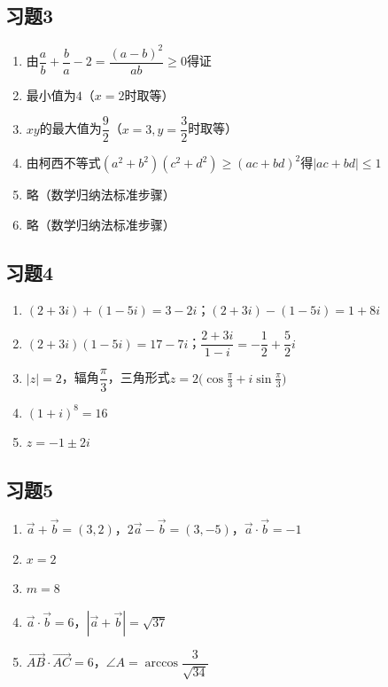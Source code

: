 \documentclass[a4paper,12pt]{ctexart}
\begin{document}
\subsection*{习题3}
\begin{enumerate}
  \item 由$\dfrac{a}{b}+\dfrac{b}{a}-2=\dfrac{(a-b)^2}{ab}\ge0$得证
  \item 最小值为$4$（$x=2$时取等）
  \item $xy$的最大值为$\dfrac92$（$x=3,y=\dfrac32$时取等）
  \item 由柯西不等式$(a^2+b^2)(c^2+d^2)\ge(ac+bd)^2$得$|ac+bd|\le1$
  \item 略（数学归纳法标准步骤）
  \item 略（数学归纳法标准步骤）
\end{enumerate}

\subsection*{习题4}
\begin{enumerate}
  \item $(2+3i)+(1-5i)=3-2i$；$(2+3i)-(1-5i)=1+8i$
  \item $(2+3i)(1-5i)=17-7i$；$\dfrac{2+3i}{1-i}=-\dfrac12+\dfrac52i$
  \item $|z|=2$，辐角$\dfrac\pi3$，三角形式$z=2\bigl(\cos\frac\pi3+i\sin\frac\pi3\bigr)$
  \item $(1+i)^8=16$
  \item $z=-1\pm2i$
\end{enumerate}

\subsection*{习题5}
\begin{enumerate}
  \item $\vec a+\vec b=(3,2)$，$2\vec a-\vec b=(3,-5)$，$\vec a\cdot\vec b=-1$
  \item $x=2$
  \item $m=8$
  \item $\vec a\cdot\vec b=6$，$|\vec a+\vec b|=\sqrt{37}$
  \item $\overrightarrow{AB}\cdot\overrightarrow{AC}=6$，$\angle A=\arccos\dfrac{3}{\sqrt{34}}$
\end{enumerate}
\end{document}
